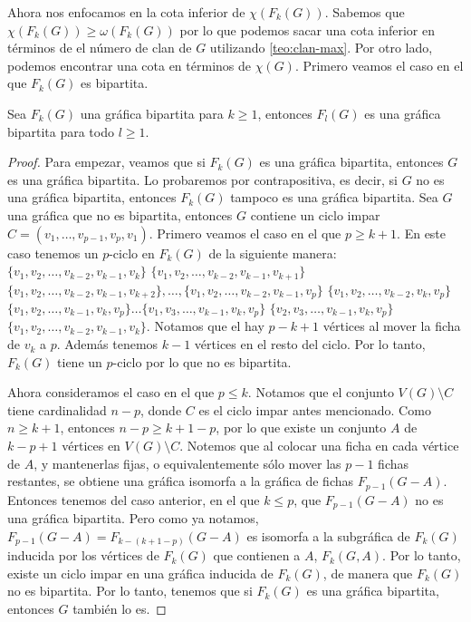 
Ahora nos enfocamos en la cota inferior de $ \chi (F_k(G))$. Sabemos que $\chi
(F_k(G)) \geq \omega (F_k(G))$ por lo que podemos sacar una cota inferior en
t\'erminos de el n\'umero de clan de $G$ utilizando \cref{teo:clan-max}. Por
otro lado, podemos encontrar una cota en t\'erminos de $\chi (G)$. Primero
veamos el caso en el que $F_k(G)$ es bipartita.


\begin{proposicion}
\label{prop:biparticion F(G)}
    Sea $F_k(G)$ una gr\'afica bipartita para $k \geq 1$, entonces $F_l(G)$
    es una gr\'afica bipartita para todo $l \geq 1$.
\end{proposicion}

\begin{proof}
    Para empezar, veamos que si $F_k(G)$ es una gr\'afica bipartita, entonces
    $G$ es una gr\'afica bipartita. Lo probaremos por contrapositiva, es decir,
    si $G$ no es una gr\'afica bipartita, entonces $F_k(G)$ tampoco es una
    gr\'afica bipartita. Sea $G$ una gr\'afica que no es bipartita, entonces $G$
    contiene un ciclo impar $C=(v_1, \dots, v_{p-1}, v_p, v_1)$. Primero veamos
    el caso en el que $p \geq k+1$. En este caso tenemos un $p$-ciclo en
    $F_k(G)$ de la siguiente manera: $\{v_1, v_2, \dots, v_{k-2}, v_{k-1},
    v_k\}$ $\{v_1, v_2, \dots, v_{k-2}, v_{k-1}, v_{k+1}\}$ $\{v_1, v_2, \dots,
    v_{k-2}, v_{k-1}, v_{k+2}\}, \dots, \{v_1, v_2, \dots, v_{k-2}, v_{k-1},
    v_p\}$ $\{v_1, v_2, \dots, v_{k-2}, v_k, v_p\}$ $\{v_1, v_2, \dots, v_{k-1},
    v_k, v_p\} \dots \{v_1, v_3, \dots, v_{k-1}, v_k, v_p\}$ $\{v_2, v_3,
    \dots, v_{k-1}, v_k, v_p\}$ $\{v_1, v_2, \dots, v_{k-2}, v_{k-1}, v_k\}$.
    Notamos que el hay $p-k+1$ v\'ertices al mover la ficha de $v_k$ a $p$.
    Adem\'as tenemos $k-1$ v\'ertices en el resto del ciclo. Por lo tanto,
    $F_k(G)$ tiene un $p$-ciclo por lo que no es bipartita.
    
    Ahora consideramos el caso en el que $p \leq k$. Notamos que el conjunto
    $V(G)\setminus C$ tiene cardinalidad $n-p$, donde $C$ es el ciclo impar
    antes mencionado. Como $n \geq k+1$, entonces $n-p \geq k+1-p$, por lo que
    existe un conjunto $A$ de $k-p+1$ v\'ertices en $V(G)\setminus C$. Notemos
    que al colocar una ficha en cada v\'ertice de $A$, y mantenerlas fijas, o
    equivalentemente s\'olo mover las $p-1$ fichas restantes, se obtiene una
    gr\'afica isomorfa a la gr\'afica de fichas $F_{p-1}(G-A)$. Entonces tenemos
    del caso anterior, en el que $k \leq p$, que $F_{p-1}(G-A)$ no es una
    gr\'afica bipartita. Pero como ya notamos, $F_{p-1}(G-A) = F_{k-(k+1-p)}
    (G-A)$ es isomorfa a la subgr\'afica de $F_k(G)$ inducida por los v\'ertices
    de $F_k(G)$ que contienen a $A$, $F_k(G,A)$. Por lo tanto, existe un ciclo
    impar en una gr\'afica inducida de $F_k(G)$, de manera que $F_k(G)$ no es
    bipartita. Por lo tanto, tenemos que si $F_k(G)$ es una gr\'afica bipartita,
    entonces $G$ tambi\'en lo es.


\end{proof}
